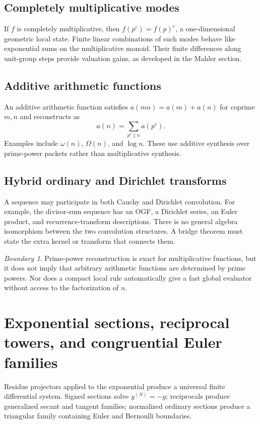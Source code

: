 \documentclass[11pt]{article}
\theoremstyle{definition}\newtheorem{definition}[theorem]{Definition}\newtheorem{example}[theorem]{Example}\newtheorem{construction}[theorem]{Construction}\newtheorem{algorithm}[theorem]{Algorithm}\newtheorem{conjecture}[theorem]{Conjecture}\newtheorem{problem}[theorem]{Problem}
\theoremstyle{remark}\newtheorem{remark}[theorem]{Remark}\newtheorem{boundary}[theorem]{Boundary}\newtheorem{certificate}[theorem]{Computational Certificate}\newtheorem{classical}[theorem]{Classical Input}\newtheorem{principle}[theorem]{Structural Principle}
\begin{document}
\subsection{Completely multiplicative modes}
If $f$ is completely multiplicative, then $f(p^e)=f(p)^e$, a one-dimensional geometric local state.  Finite linear combinations of such modes behave like exponential sums on the multiplicative monoid.  Their finite differences along unit-group steps provide valuation gains, as developed in the Mahler section.

\subsection{Additive arithmetic functions}
An additive arithmetic function satisfies $a(mn)=a(m)+a(n)$ for coprime $m,n$ and reconstructs as
\[
 a(n)=\sum_{p^e\parallel n}a(p^e).
\]
Examples include $\omega(n)$, $\Omega(n)$, and $\log n$.  These use additive synthesis over prime-power packets rather than multiplicative synthesis.

\subsection{Hybrid ordinary and Dirichlet transforms}
A sequence may participate in both Cauchy and Dirichlet convolution.  For example, the divisor-sum sequence has an OGF, a Dirichlet series, an Euler product, and recurrence-transform descriptions.  There is no general algebra isomorphism between the two convolution structures.  A bridge theorem must state the extra kernel or transform that connects them.

\begin{boundary}
Prime-power reconstruction is exact for multiplicative functions, but it does not imply that arbitrary arithmetic functions are determined by prime powers.  Nor does a compact local rule automatically give a fast global evaluator without access to the factorization of $n$.
\end{boundary}


\section{Exponential sections, reciprocal towers, and congruential Euler families}

Residue projectors applied to the exponential produce a universal finite differential system.  Signed sections solve $y^{(N)}=-y$; reciprocals produce generalized secant and tangent families; normalized ordinary sections produce a triangular family containing Euler and Bernoulli boundaries.
\end{document}
